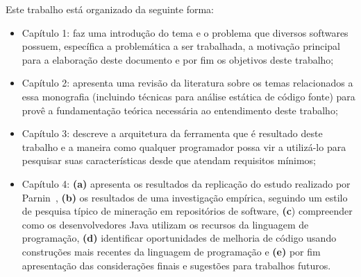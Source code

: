  Este trabalho está organizado da seguinte forma:
	\begin{itemize}
		\item Capítulo 1: faz uma introdução do tema e o problema que diversos softwares possuem, específica a problemática a ser trabalhada, a motivação principal para a elaboração deste documento e por fim os objetivos deste trabalho;
		
		\item Capítulo 2: apresenta uma revisão da literatura sobre os temas relacionados a essa monografia (incluindo técnicas para análise estática de código fonte) para provê a fundamentação teórica necessária ao entendimento deste trabalho;
		
		\item Capítulo 3: descreve a arquitetura da ferramenta que é resultado deste trabalho e a maneira como qualquer programador possa vir a utilizá-lo para pesquisar suas características desde que atendam requisitos mínimos;
		
		\item Capítulo 4: \textbf{(a)} apresenta os resultados da replicação do estudo realizado por Parnin~\cite{Parnin:ACM2011}, \textbf{(b)} os resultados de uma investigação empírica, seguindo um estilo de pesquisa típico de mineração em 
		repositórios de software, \textbf{(c}) compreender como os desenvolvedores 
		Java utilizam os recursos da linguagem de programação, \textbf{(d)} identificar 
		oportunidades de melhoria de código usando construções mais 
		recentes da linguagem de programação e \textbf{(e)} por fim apresentação das considerações finais e sugestões para trabalhos futuros. 
	\end{itemize}



	
%	

